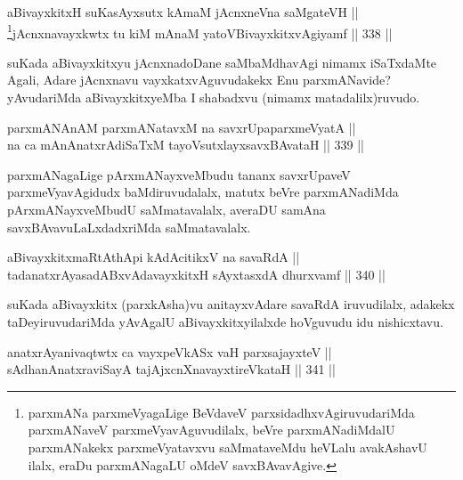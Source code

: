 \begin{shl}
aBivayxkitxH suKasAyxsutx kAmaM jAcnxneVna saMgateVH || \\
\footnote{parxmANa parxmeVyagaLige BeVdaveV parxsidadhxvAgiruvudariMda parxmANaveV parxmeVyavAguvudilalx, beVre parxmANadiMdalU parxmANakekx parxmeVyatavxvu saMmataveMdu heVLalu avakAshavU ilalx, eraDu parxmANagaLU oMdeV savxBAvavAgive.}jAcnxnavayxkwtx tu kiM mAnaM yatoV\s BivayxkitxvAgiyamf \hfill || 338 ||  
\end{shl}


\begin{artha}
suKada aBivayxkitxyu jAcnxnadoDane saMbaMdhavAgi nimamx
iSaTxdaMte Agali, Adare jAcnxnavu vayxkatxvAguvudakekx Enu
parxmANavide? yAvudariMda aBivayxkitxyeMba I shabadxvu (nimamx
matadalilx)ruvudo. 
\end{artha}


\begin{shl}
parxmANAnAM parxmANatavxM na savxrUpaparxmeVyatA || \\
na ca mAnAnatxrAdiSaTxM tayoVsutxlayxsavxBAvataH \hfill || 339 ||  
\end{shl}

\begin{artha}
parxmANagaLige pArxmANayxveMbudu tananx savxrUpaveV parxmeVyavAgidudx
baMdiruvudalalx, matutx beVre parxmANadiMda pArxmANayxveMbudU
saMmatavalalx, averaDU samAna savxBAvavuLaLxdadxriMda saMmatavalalx.
\end{artha}


\begin{shl}
aBivayxkitxmaRtA\s thApi kAdAcitikxV na savaRdA || \\
tadanatxrAyasadABxvAdavayxkitxH sAyxtasxdA dhurxvamf \hfill || 340 ||  
\end{shl}

\begin{artha}
suKada aBivayxkitx (parxkAsha)vu anitayxvAdare savaRdA iruvudilalx,
adakekx taDeyiruvudariMda yAvAgalU aBivayxkitxyilalxde hoVguvudu idu nishicxtavu.
\end{artha}


\begin{shl}
anatxrAyanivaqtwtx ca vayxpeVkASx vaH parxsajayxteV ||  \\
sAdhanAnatxraviSayA tajAjxcnXnavayxtireVkataH \hfill || 341 ||  
\end{shl}


